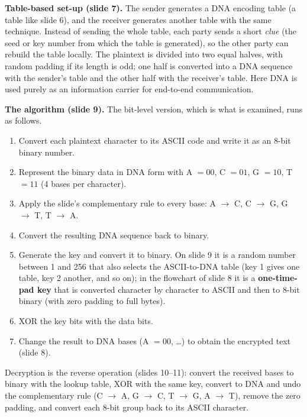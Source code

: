 \textbf{Table-based set-up (slide 7).} The sender generates a DNA encoding table (a table like slide 6), and the receiver generates another table with the same technique. Instead of sending the whole table, each party sends a short \emph{clue} (the seed or key number from which the table is generated), so the other party can rebuild the table locally. The plaintext is divided into two equal halves, with random padding if its length is odd; one half is converted into a DNA sequence with the sender's table and the other half with the receiver's table. Here DNA is used purely as an information carrier for end-to-end communication.

\textbf{The algorithm (slide 9).} The bit-level version, which is what is examined, runs as follows.
\begin{enumerate}
  \item Convert each plaintext character to its ASCII code and write it as an 8-bit binary number.
  \item Represent the binary data in DNA form with A $= 00$, C $= 01$, G $= 10$, T $= 11$ (4 bases per character).
  \item Apply the slide's complementary rule to every base: A $\to$ C, C $\to$ G, G $\to$ T, T $\to$ A.
  \item Convert the resulting DNA sequence back to binary.
  \item Generate the key and convert it to binary. On slide 9 it is a random number between 1 and 256 that also selects the ASCII-to-DNA table (key 1 gives one table, key 2 another, and so on); in the flowchart of slide 8 it is a \textbf{one-time-pad key} that is converted character by character to ASCII and then to 8-bit binary (with zero padding to full bytes).
  \item XOR the key bits with the data bits.
  \item Change the result to DNA bases (A $= 00$, \dots) to obtain the encrypted text (slide 8).
\end{enumerate}
Decryption is the reverse operation (slides 10--11): convert the received bases to binary with the lookup table, XOR with the same key, convert to DNA and undo the complementary rule (C $\to$ A, G $\to$ C, T $\to$ G, A $\to$ T), remove the zero padding, and convert each 8-bit group back to its ASCII character.

